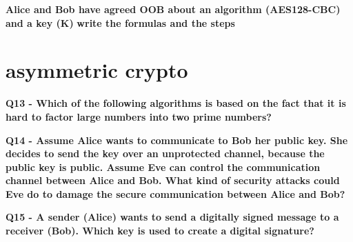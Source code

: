 \textbf{Alice and Bob have agreed OOB about an algorithm (AES128-CBC) and a key (K)}
\textbf{write the formulas and the steps}



\section*{asymmetric crypto}

\textbf{Q13 - Which of the following algorithms is based on the fact that it is hard to factor large numbers into two prime numbers?}

\textbf{Q14 - Assume Alice wants to communicate to Bob her public key. She decides to send the key over an unprotected channel, because the public key is public. Assume Eve can control the communication channel between Alice and Bob. What kind of security attacks could Eve do to damage the secure communication between Alice and Bob?}

\textbf{Q15 - A sender (Alice) wants to send a digitally signed message to a receiver (Bob). Which key is used to create a digital signature?}

